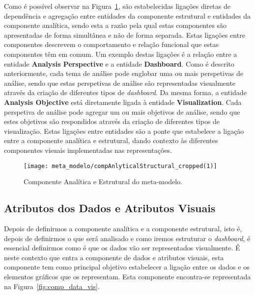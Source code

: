 Como é possível observar na Figura~\ref{fig:comp_anal_struct}, são estabelecidas ligações diretas de dependência e agregação entre entidades da componente estrutural e entidades da componente analítica, sendo esta a razão pela qual estas componentes são apresentadas de forma simultânea e não de forma separada. Estas ligações entre componentes descrevem o comportamento e relação funcional que estas componentes têm em comum. Um exemplo destas ligações é a relação entre a entidade \textbf{Analysis Perspective} e a entidade \textbf{Dashboard}. Como é descrito anteriormente, cada tema de análise pode englobar uma ou mais perspetivas de análise, sendo que estas perspetivas de análise são representadas visualmente através da criação de diferentes tipos de \textit{dashboard}. Da mesma forma, a entidade \textbf{Analysis Objective} está diretamente ligada à entidade \textbf{Visualization}. Cada perspetiva de análise pode agregar um ou mais objetivos de análise, sendo que estes objetivos são respondidos através da criação de diferentes tipos de visualização. Estas ligações entre entidades são a ponte que estabelece a ligação entre a componente analítica e estrutural, dando contexto às diferentes componentes visuais implementadas nas representações.

\begin{figure}[htbp]
  \texttt{[image: meta\_modelo/compAnlyticalStructural\_cropped(1)]}
  \centering
  \caption{Componente Analítica e Estrutural do meta-modelo.}
  \label{fig:comp_anal_struct}
\end{figure}

\subsection{Atributos dos Dados e Atributos Visuais} %
\label{sub:data_vis_attr}

Depois de definirmos a componente analítica e a componente estrutural, isto é, depois de definirmos o que será analisado e como iremos estruturar o \textit{dashboard}, é essencial definirmos como é que os dados vão ser representados visualmente. É neste contexto que entra a componente de dados e atributos visuais, esta componente tem como principal objetivo estabelecer a ligação entre os dados e os elementos gráficos que os representam. Esta componente encontra-se representada na Figura~\ref{fig:comp_data_vis}.

